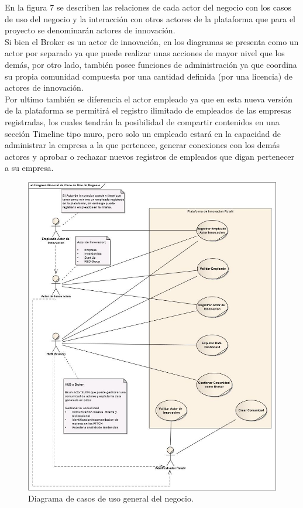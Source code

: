 En la figura 7 se describen las relaciones de cada actor del negocio con los casos
de uso del negocio y la interacción con otros actores de la plataforma que para el proyecto se
denominarán actores de innovación.\\

Si bien el Broker es un actor de innovación, en los diagramas se presenta como un actor por
separado ya que puede realizar unas acciones de mayor nivel que los demás, por otro lado,
también posee funciones de administración ya que coordina su propia comunidad compuesta
por una cantidad definida (por una licencia) de actores de innovación.\\

Por ultimo también se diferencia el actor empleado ya que en esta nueva versión de la
plataforma se permitirá el registro ilimitado de empleados de las empresas registradas, los
cuales tendrán la posibilidad de compartir contenidos en una sección Timeline tipo muro,
pero solo un empleado estará en la capacidad de administrar la empresa a la que pertenece,
generar conexiones con  los demás actores y aprobar o rechazar nuevos registros de
empleados que digan pertenecer a su empresa.\\


\begin{figure}[ht]
	\includegraphics[scale=0.6, center]{images/casos.jpg}
	\caption{Diagrama de casos de uso general del negocio.}
	\label{fig:img7}
\end{figure}

